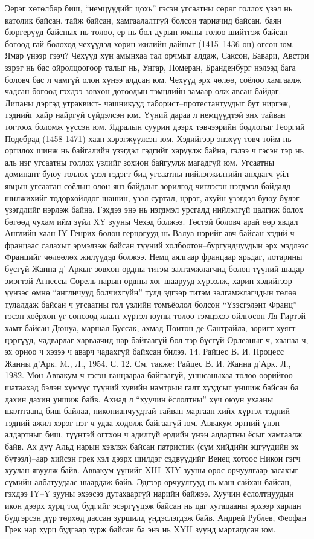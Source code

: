Эерэг хөтөлбөр биш, “немцүүдийг цохь” гэсэн угсаатны сөрөг голлох үзэл нь католик байсан, тайж байсан, хамгаалалтгүй болсон тариачид байсан, баян бюргерүүд байсных нь төлөө, ер нь бол дурын юмны төлөө шийтгэж байсан бөгөөд гай болоход чехүүдэд хорин жилийн дайныг (1415–1436 он) өгсөн юм. Ямар үнээр гээч? Чехүүд хүн амынхаа тал орчмыг алдаж, Саксон, Бавари, Австри зэрэг нь бас ойролцоогоор талыг нь, Унгар, Померан, Бранденбург нэлээд бага боловч бас л чамгүй олон хүнээ алдсан юм.
Чехүүд эрх чөлөө, соёлоо хамгаалж чадсан бөгөөд гэхдээ зөвхөн дотоодын тэмцлийн замаар олж авсан байдаг. Липаны дэргэд утраквист- чашникууд таборист–протестантуудыг бут ниргэж, тэднийг хайр найргүй сүйдэлсэн юм. Үүний дараа л немцүүдтэй энх тайван тогтоох боломж үүссэн юм. Ядралын суурин дээрх тэвчээрийн бодлогыг Георгий Подебрад (1458-1471) хаан хэрэгжүүлсэн юм.
Хэдийгээр энэхүү товч тойм нь оргилох шинж нь байгалийн үзэгдэл гэдгийг харуулж байна, гэлээ ч гэсэн тэр нь аль нэг угсаатны голлох үзлийг зохион байгуулж магадгүй юм. Угсаатны доминант буюу голлох үзэл гэдэгт бид угсаатны нийлэгжилтийн анхдагч үйл явцын угсаатан соёлын олон янз байдлыг зорилгод чиглэсэн нэгдмэл байдалд шилжихийг тодорхойлдог шашин, үзэл суртал, цэрэг, ахуйн үзэгдэл буюу бүлэг үзэгдлийг нэрлэж байна. Гэхдээ энэ нь нэгдмэл урсгалд нийлэлгүй цалгиж болох бөгөөд чухам ийм зүйл XY зууны Чехэд болжээ.
Төстэй боловч арай өөр явдал Английн хаан IY Генрих болон герцогууд нь Валуа нэрийг авч байсан хэдий ч францаас салахыг эрмэлзэж байсан түүний холбоотон–бургундчуудын эрх мэдлээс Францийг чөлөөлөх жилүүдэд болжээ. Немц аялгаар францаар ярьдаг, лотарины бүсгүй Жанна д’ Аркыг зөвхөн ордны титэм залгамжлагчид болон түүний шадар эмэгтэй Агнессы Сорель нарын ордны хог шаарууд хүрээлж, харин хэдийгээр үүнээс өмнө “англичууд болчихгүйн” тулд эдгээр титэм залгамжлагчдын төлөө тулалдаж байсан ч угсаатны гол үзлийн томъёолол болсон “Үзэсгэлэнт Франц” гэсэн хоёрхон үг сонсоод ялалт хүртэл юуны төлөө тэмцэхээ ойлгосон Ля Гиртэй хамт байсан Дюнуа, маршал Буссак, ахмад Поитон де Сантрайла, зоригт хуягт цэргүүд, чадварлаг харваачид нар байгаагүй бол тэр бүсгүй Орлеаныг ч, хаанаа ч, эх орноо ч хэзээ ч аварч чадахгүй байхсан билээ. 14. Райцес В. И. Процесс Жанны д’Арк. M., Л., 1954. С. 12. См. также: Райцес В. И. Жанна д’Арк. Л., 1982.
Мөн Аввакум ч гэсэн ганцаараа байгаагүй, уншсаныхаа төлөө өөрийгөө шатаахад бэлэн хүмүүс түүний хувийн намтрын галт хуудсыг уншиж байсан ба дахин дахин уншиж байв. Ахиад л “хуучин ёслолтны” хүч оюун ухааны шалтгаанд биш байлаа, никонианчуудтай тайван маргаан хийх хүртэл тэдний тэдний ажил хэрэг нэг ч удаа хөдөлж байгаагүй юм. Аввакум эртний үнэн алдартныг биш, түүнтэй огтхон ч адилгүй ердийн үнэн алдартны ёсыг хамгаалж байв. Ах дүү Альд нарын хэвлэж байсан патристик (сүм хийдийн эцгүүдийн эх бүтээл)–аар хийсэн грек хэл дээрх шилдэг сэдвүүдийг Венец хотоос Никон гэгч хуулан явуулж байв. Аввакум үүнийг XIII–XIY зууны орос орчуулгаар засахыг сүмийн албатуудаас шаардаж байв. Эдгээр орчуулгууд нь маш сайхан байсан, гэхдээ IY–Y зууны эхээсээ дутахааргүй нарийн байжээ. Хуучин ёслолтнуудын икон дээрх хурц тод будгийг эсэргүүцэж байсан нь цаг хугацааны эрхээр харлан бүдгэрсэн дүр төрхөд дассан зуршилд үндэслэгдэж байв. Андрей Рублев, Феофан Грек нар хурц будгаар зурж байсан ба энэ нь XYII зуунд мартагдсан юм.
